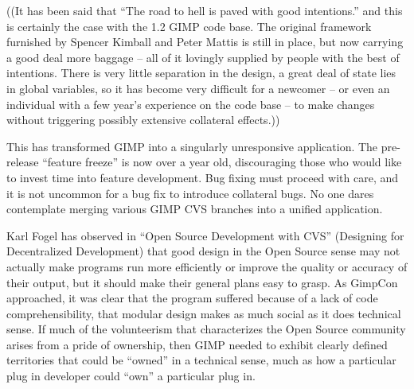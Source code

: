 ((It has been said that ``The road to hell is paved with good intentions.'' and this is certainly the case with the 1.2 GIMP code base. The original framework furnished by Spencer Kimball and Peter Mattis is still in place, but now carrying a good deal more baggage -- all of it lovingly supplied by people with the best of intentions. There is very little separation in the design, a great deal of state lies in global variables, so it has become very difficult for a newcomer -- or even an individual with a few year's experience on the code base -- to make changes without triggering possibly extensive collateral effects.))

This has transformed GIMP into a singularly unresponsive application.
The pre-release ``feature freeze'' is now over a year old, discouraging
those who would like to invest time into feature development.  Bug fixing must proceed with care, and it is not uncommon for a bug fix to introduce collateral bugs. No one dares contemplate merging various GIMP CVS branches into a unified application. 
 
Karl Fogel has observed in ``Open Source Development with CVS''
(Designing for Decentralized Development) that good design in the Open
Source sense may not actually make programs run more efficiently or improve the quality or accuracy of their output, but it should make their general plans easy to grasp. As GimpCon approached, it was clear that the program suffered because of a lack of code comprehensibility, that modular design makes as much social as it does technical sense. If much of the volunteerism that characterizes the Open Source community arises from a pride of ownership, then GIMP needed to exhibit clearly defined territories that could be ``owned'' in a technical sense, much as how a particular plug in developer could ``own'' a particular plug in. 

